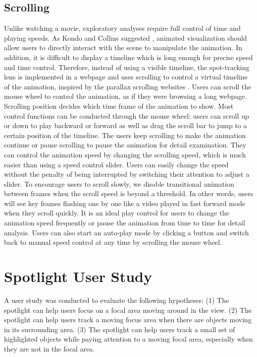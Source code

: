\documentclass[review]{vgtc}                 %
\begin{document}
\subsection{Scrolling}
Unlike watching a movie, exploratory analyses require full control of time and playing speeds. As Kondo and Collins suggested \cite{kondo_dimpvis:_2014}, animated visualization should allow users to directly interact with the scene to manipulate the animation. In addition, it is difficult to display a timeline which is long enough for precise speed and time control. Therefore, instead of using a visible timeline, the spot-tracking lens is implemented in a webpage and uses scrolling to control a virtual timeline of the animation, inspired by the parallax scrolling websites \cite{frederick2013effects}. Users can scroll the mouse wheel to control the animation, as if they were browsing a long webpage. Scrolling position decides which time frame of the animation to show. Most control functions can be conducted through the mouse wheel: users can scroll up or down to play backward or forward as well as drag the scroll bar to jump to a certain position of the timeline. The users keep scrolling to make the animation continue or pause scrolling to pause the animation for detail examination. They can control the animation speed by changing the scrolling speed, which is much easier than using a speed control slider. Users can easily change the speed without the penalty of being interrupted by switching their attention to adjust a slider.   To encourage users to scroll slowly, we disable transitional animation between frames when the scroll speed is beyond a threshold. In other words, users will see key frames flashing one by one like a video played in fast forward mode when they scroll quickly. It is an ideal play control for users to change the animation speed frequently or pause the animation from time to time for detail analysis. Users can also start an auto-play mode by clicking a button and switch back to manual speed control at any time by scrolling the mouse wheel.

\section{Spotlight User Study}
\label{sec:spotlightstudy}
A user study was conducted to evaluate the following hypotheses: (1) The spotlight can help users focus on a focal area moving around in the view. (2) The spotlight can help users track a moving focus area when there are objects moving in its surrounding area. (3) The spotlight can help users track a small set of highlighted objects while paying attention to a moving focal area, especially when they are not in the focal area.
\end{document}
